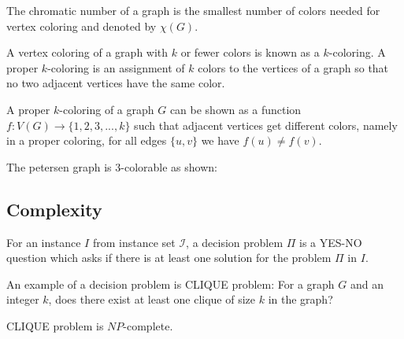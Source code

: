 \documentclass{beamer}
\begin{document}
{\begin{defi}
The chromatic number of a graph is the smallest number of colors needed for
vertex coloring and denoted by $\chi(G)$. 

A vertex coloring of a graph with $k$ or fewer colors is known as a $k$-coloring. A proper $k$-coloring is an assignment of $k$ colors to the vertices of a graph so that no two adjacent vertices have the same color. 

A proper $k$-coloring of a graph $G$ can be shown as a function $f: V(G) \to \{1, 2, 3, . . . , k\}$ such that adjacent vertices get different colors, namely in a proper coloring, for all edges $\{u, v\}$ we have $f(u) \not= f(v)$.
\end{defi}


\begin{exam}
The petersen graph is $3$-colorable as shown:
\vspace{1cm}
\begin{center}
\end{center}

\end{exam}
\vspace{0.5cm}

\newpage
\subsection{Complexity}{\label{comp}}

\begin{defi}
For an instance $I$ from instance set $\mathcal{I}$, a decision problem $\Pi$ is a YES-NO question which asks if
there is at least one solution for the problem $\Pi$ in $I$.
\end{defi}

\begin{exam}
An example of a decision problem is CLIQUE problem: For a graph $G$ and an integer $k$, does there exist at least one clique of size $k$ in the graph? 
\end{exam}

\begin{theorem}
CLIQUE problem is $NP$-complete. \cite{karp}
\end{theorem}

}
\end{document}
